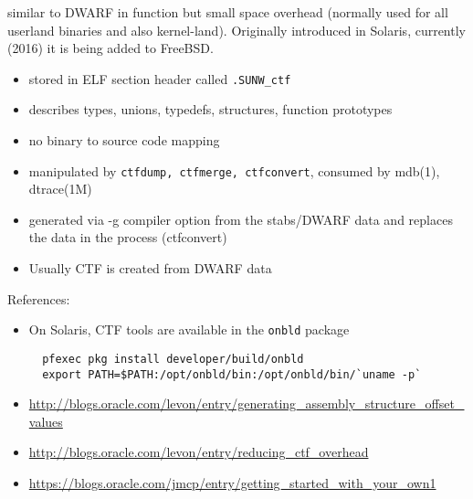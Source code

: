 similar to DWARF in function but small space overhead (normally
used for all userland binaries and also kernel-land). Originally introduced in
Solaris, currently (2016) it is being added to FreeBSD.

\begin{itemize}
  \item stored in ELF section header called \texttt{.SUNW\_ctf}
  \item describes types, unions, typedefs, structures, function prototypes
  \item no binary to source code mapping
  \item manipulated by \texttt{ctfdump, ctfmerge, ctfconvert}, consumed by
    mdb(1), dtrace(1M)
  \item generated via -g compiler option from the stabs/DWARF data
    and replaces the data in the process (ctfconvert)
  \item Usually CTF is created from DWARF data
\end{itemize}

References:
  \begin{itemize}
  \item On Solaris, CTF tools are available in the \texttt{onbld} package
  \begin{verbatim}
  pfexec pkg install developer/build/onbld
  export PATH=$PATH:/opt/onbld/bin:/opt/onbld/bin/`uname -p`
  \end{verbatim}
  \item \url{http://blogs.oracle.com/levon/entry/generating\_assembly\_structure\_offset\_values}
  \item \url{http://blogs.oracle.com/levon/entry/reducing\_ctf\_overhead}
  \item \url{https://blogs.oracle.com/jmcp/entry/getting_started_with_your_own1}
\end{itemize}


